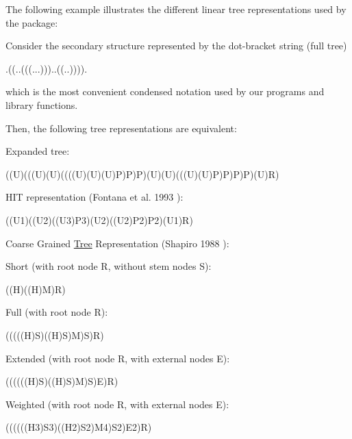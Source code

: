 The following example illustrates the different linear tree representations used by the package\+:

Consider the secondary structure represented by the dot-\/bracket string (full tree) \begin{DoxyVerb}.((..(((...)))..((..)))). \end{DoxyVerb}
 which is the most convenient condensed notation used by our programs and library functions.

Then, the following tree representations are equivalent\+:


\begin{DoxyItemize}
\item Expanded tree\+: \begin{DoxyVerb}((U)(((U)(U)((((U)(U)(U)P)P)P)(U)(U)(((U)(U)P)P)P)P)(U)R) \end{DoxyVerb}

\item H\+IT representation (Fontana et al. 1993 \cite{fontana:1993b})\+: \begin{DoxyVerb}((U1)((U2)((U3)P3)(U2)((U2)P2)P2)(U1)R) \end{DoxyVerb}

\item Coarse Grained \mbox{\hyperlink{structTree}{Tree}} Representation (Shapiro 1988 \cite{shapiro:1988})\+:
\begin{DoxyItemize}
\item Short (with root node {\ttfamily R}, without stem nodes {\ttfamily S})\+: \begin{DoxyVerb}((H)((H)M)R) \end{DoxyVerb}

\item Full (with root node {\ttfamily R})\+: \begin{DoxyVerb}(((((H)S)((H)S)M)S)R) \end{DoxyVerb}

\item Extended (with root node {\ttfamily R}, with external nodes {\ttfamily E})\+: \begin{DoxyVerb}((((((H)S)((H)S)M)S)E)R) \end{DoxyVerb}

\item Weighted (with root node {\ttfamily R}, with external nodes {\ttfamily E})\+: \begin{DoxyVerb}((((((H3)S3)((H2)S2)M4)S2)E2)R) \end{DoxyVerb}

\end{DoxyItemize}
\end{DoxyItemize}

